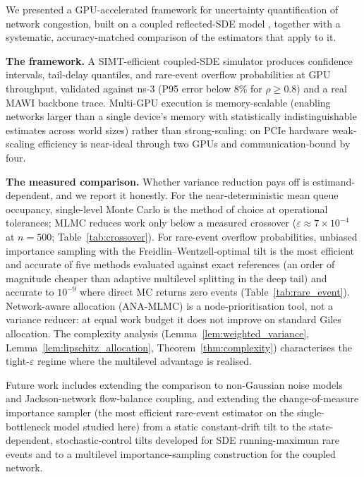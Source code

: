 \documentclass{ieeeaccess}
\begin{document}
We presented a GPU-accelerated framework for uncertainty quantification of network congestion,
built on a coupled reflected-SDE model \cite{kang2007}, together with a systematic,
accuracy-matched comparison of the estimators that apply to it.

\textbf{The framework.} A SIMT-efficient coupled-SDE simulator produces confidence intervals,
tail-delay quantiles, and rare-event overflow probabilities at GPU throughput, validated against
ns-3 (P95 error below 8\% for $\rho\geq0.8$) and a real MAWI backbone trace. Multi-GPU execution
is memory-scalable (enabling networks larger than a single device's memory with statistically
indistinguishable estimates across world sizes) rather than strong-scaling: on PCIe hardware
weak-scaling efficiency is near-ideal through two GPUs and communication-bound by four.

\textbf{The measured comparison.} Whether variance reduction pays off is estimand-dependent, and
we report it honestly. For the near-deterministic mean queue occupancy, single-level Monte Carlo
is the method of choice at operational tolerances; MLMC reduces work only below a measured
crossover ($\varepsilon\approx7\times10^{-4}$ at $n{=}500$; Table~\ref{tab:crossover}). For rare-event overflow
probabilities, unbiased importance sampling with the Freidlin--Wentzell-optimal tilt is the most
efficient and accurate of five methods evaluated against exact references (an order of magnitude
cheaper than adaptive multilevel splitting in the deep tail) and accurate to $10^{-9}$ where direct
MC returns zero events (Table~\ref{tab:rare_event}). Network-aware allocation (ANA-MLMC) is a
node-prioritisation tool, not a variance reducer: at equal work budget it does not improve on
standard Giles allocation. The complexity analysis (Lemma~\ref{lem:weighted_variance},
Lemma~\ref{lem:lipschitz_allocation}, Theorem~\ref{thm:complexity}) characterises the
tight-$\varepsilon$ regime where the multilevel advantage is realised.

Future work includes extending the comparison to non-Gaussian noise models and Jackson-network
flow-balance coupling, and extending the change-of-measure importance sampler (the most efficient
rare-event estimator on the single-bottleneck model studied here) from a static
constant-drift tilt to the state-dependent, stochastic-control tilts developed for SDE running-maximum
rare events \cite{benrached2026ensemble} and to a multilevel importance-sampling construction
\cite{benrached2025multilevel} for the coupled network.
\end{document}
